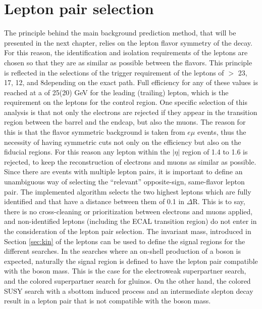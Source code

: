 \section{Lepton pair selection}\label{sec:lepSelection}
\noindent\justify
The principle behind the main background prediction method, that will be presented in the next chapter, relies on the lepton flavor symmetry of the \PW decay.
For this reason, the identification and isolation requirements of the leptons are chosen so that they are as similar as possible between the flavors. 
This principle is reflected in the selections of the trigger requirement of the leptons of \pt $>$ 23, 17, 12, and 8\GeV depending on the exact path. 
Full efficiency for any of these values is reached at a \pt of 25(20) GeV for the leading (trailing) lepton, which is the requirement on the leptons for the control region. 
One specific selection of this analysis is that not only the electrons are rejected if they appear in the transition region between the barrel and the endcap, but also the muons. 
The reason for this is that the flavor symmetric background is taken from $e\mu$ events, thus the necessity of having symmetric cuts not only on the efficiency but also on the fiducial regions. 
For this reason any lepton within the $|\eta|$ region of 1.4 to 1.6 is rejected, to keep the reconstruction of electrons and muons as similar as possible. 
\newpara
\noindent\justify
Since there are events with multiple lepton pairs, it is important to define an unambiguous way of selecting the ``relevant''  opposite-sign, same-flavor lepton pair. 
The implemented algorithm selects the two highest \pt leptons which are fully identified and that have a distance between them of 0.1 in $\Delta$R. 
This is to say, there is no cross-cleaning or prioritization between electrons and muons applied, and non-identified leptons (including the ECAL transition region) do not enter in the consideration of the lepton pair selection. 
\newpara
\noindent\justify
The invariant mass, introduced in Section \ref{sec:kin} of the leptons can be used to define the signal regions for the different searches. 
In the searches where an on-shell production of a \PZ boson is expected, naturally the signal region is defined to have the lepton pair compatible with the \PZ boson mass.  
This is the case for the electroweak superpartner search, and the colored superpartner search for gluinos. 
On the other hand, the colored SUSY search with a sbottom induced process and an intermediate slepton decay result in a lepton pair that is not compatible with the \PZ boson mass. 
